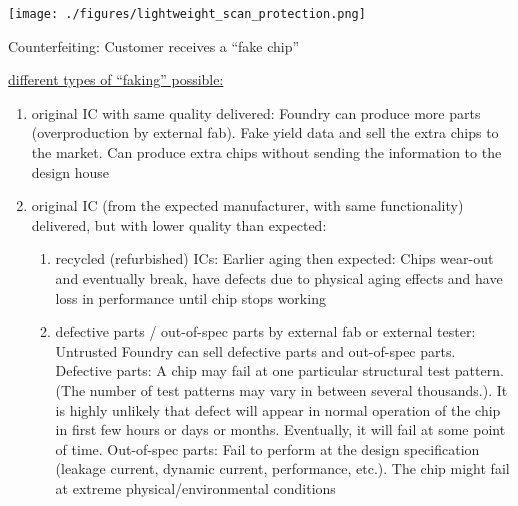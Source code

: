\documentclass[landscape, a4paper]{article}
\begin{document}
\begin{minipage}[t]{0.2\linewidth}
\begin{betterlist}
\begin{enumerate}
\begin{enumerate}
				\texttt{[image: ./figures/lightweight\_scan\_protection.png]}
			\end{enumerate}
		\end{enumerate}
	\end{betterlist}
	\begin{betterlist}
		\item \alert{Counterfeiting:} Customer receives a \enquote{fake chip}
		\item \underline{different types of \enquote{faking} possible:}
		\begin{enumerate}
			\item \alert{original IC with same quality delivered:} Foundry can produce more parts (overproduction by external fab). Fake yield data and sell the extra chips to the market. Can produce extra chips without sending the information to the design house
			\item \alert{original IC (from the expected manufacturer, with same functionality) delivered, but with lower quality than expected:}
			\begin{enumerate}[label=\color{PrimaryColor}\bfseries\alph*.]
				\item \alert{recycled (refurbished) ICs:} Earlier aging then expected: Chips wear-out and eventually break, have defects due to physical aging effects and have loss in performance until chip stops working
				\item \alert{defective parts / out-of-spec parts by external fab or external tester:} Untrusted Foundry can sell defective parts and out-of-spec parts. \alert{Defective parts:} A chip may fail at one particular structural test pattern. (The number of test patterns may vary in between several thousands.). It is highly unlikely that defect will appear in normal operation of the chip in first few hours or days or months. Eventually, it will fail at some point of time. \alert{Out-of-spec parts:} Fail to perform at the design specification (leakage current, dynamic current, performance, etc.). The chip might fail at extreme physical/environmental conditions

\end{enumerate}
\end{enumerate}
\end{betterlist}
\end{minipage}
\end{document}
